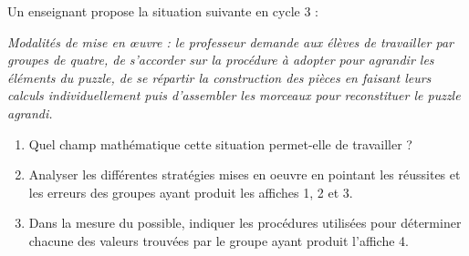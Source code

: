\begin{exercice}[CRPE 2018 G2]
Un enseignant propose la situation suivante en cycle 3 :
\begin{center}
\end{center}
{\it Modalités de mise en \oe uvre : le professeur demande aux élèves de travailler par groupes de quatre, de s’accorder sur la procédure à adopter pour agrandir les éléments du puzzle, de se répartir la construction des pièces en faisant leurs calculs individuellement puis d’assembler les morceaux pour reconstituer le puzzle agrandi.} \\
\begin{enumerate}
   \item Quel champ mathématique cette situation permet-elle de travailler ?
   \item Analyser les différentes stratégies mises en oeuvre en pointant les réussites et les erreurs des groupes ayant produit les affiches 1, 2 et 3.
   \item Dans la mesure du possible, indiquer les procédures utilisées pour déterminer chacune des valeurs trouvées par le groupe ayant produit l’affiche 4.

\end{enumerate}
\end{exercice}
